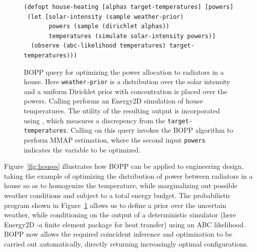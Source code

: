 \begin{figure}[t]
{		%
	}
\end{figure}

\begin{figure}[tb]
	\begin{lstlisting}[basicstyle=\ttfamily\small]
(defopt house-heating [alphas target-temperatures] [powers]
 (let [solar-intensity (sample weather-prior)
       powers (sample (dirichlet alphas))
       temperatures (simulate solar-intensity powers)]
  (observe (abc-likelihood temperatures) target-temperatures)))
	\end{lstlisting}	
	\vspace{-6pt}
	\caption{BOPP query for optimizing the power allocation to radiators in a house.  Here \lstinline{weather-prior} is a distribution over the solar intensity and a uniform Dirichlet prior with concentration  is placed over the powers. Calling \simulatec performs an Energy2D simulation of house temperatures. The utility of the resulting output is incorporated using \abcl, which measures a discrepency from the \texttt{target-temperatures}. Calling \doopt on this query invokes the BOPP algorithm to perform MMAP estimation, where the second input \lstinline{powers} indicates the variable to be optimized. \label{fig:house-heating-code}}
\end{figure}

Figure~\ref{fig:houses} illustrates how BOPP can be applied to engineering design, taking the example of optimizing the distribution of power between radiators in a house so as to homogenize the temperature, while marginalizing out possible weather conditions and subject to a total energy budget. The probabilistic program shown in Figure~\ref{fig:house-heating-code} allows us to define a prior over the uncertain weather, while conditioning on the output of a deterministic simulator (here Energy2D \citep{xie2012energy2d}-a finite element package for heat transfer) using an ABC likelihood.  BOPP now allows the required coincident inference and optimization to be carried out automatically, directly returning increasingly optimal configurations. 


